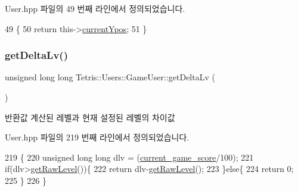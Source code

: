 User.\+hpp 파일의 49 번째 라인에서 정의되었습니다.


\begin{DoxyCode}
49                                             \{
50                     \textcolor{keywordflow}{return} this->\hyperlink{class_tetris_1_1_users_1_1_game_user_ac1d5e4a4f73eb8502faae95d7958d83e}{currentYpos};
51                 \}
\end{DoxyCode}
\mbox{\label{class_tetris_1_1_users_1_1_game_user_a1a55323cff69015417ad4d214b985724}} 
\subsubsection{\texorpdfstring{get\+Delta\+Lv()}{getDeltaLv()}}
{\footnotesize\ttfamily unsigned long long Tetris\+::\+Users\+::\+Game\+User\+::get\+Delta\+Lv (\begin{DoxyParamCaption}{ }\end{DoxyParamCaption})\hspace{0.3cm}{\ttfamily [inline]}}

\begin{DoxyReturn}{반환값}
계산된 레벨과 현재 설정된 레벨의 차이값 
\end{DoxyReturn}


User.\+hpp 파일의 219 번째 라인에서 정의되었습니다.


\begin{DoxyCode}
219                                            \{
220                 \textcolor{keywordtype}{unsigned} \textcolor{keywordtype}{long} \textcolor{keywordtype}{long} dlv = (\hyperlink{class_tetris_1_1_users_1_1_game_user_aae9d0156964b3872f7cd3917ae662ec2}{current\_game\_score}/100);
221                 \textcolor{keywordflow}{if}(dlv>\hyperlink{class_tetris_1_1_users_1_1_game_user_a3e232d2f4a0610e51136bec11453858b}{getRawLevel}())\{
222                     \textcolor{keywordflow}{return} dlv-\hyperlink{class_tetris_1_1_users_1_1_game_user_a3e232d2f4a0610e51136bec11453858b}{getRawLevel}();
223                 \}\textcolor{keywordflow}{else}\{
224                     \textcolor{keywordflow}{return} 0;
225                 \}
226             \}
\end{DoxyCode}
\mbox{\label{class_tetris_1_1_users_1_1_game_user_a12cc139cfa5d31708d0e53b07e110ab3}} 
